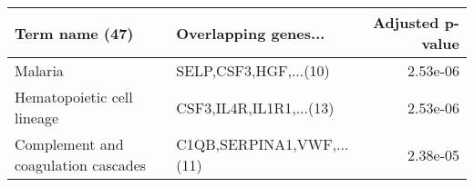 \begin{tabular}{llr}
\toprule
                     Term name (47) &      Overlapping genes... &  Adjusted p-value \\
\midrule
                            Malaria &     SELP,CSF3,HGF,...(10) &          2.53e-06 \\
         Hematopoietic cell lineage &   CSF3,IL4R,IL1R1,...(13) &          2.53e-06 \\
Complement and coagulation cascades & C1QB,SERPINA1,VWF,...(11) &          2.38e-05 \\
\bottomrule
\end{tabular}

